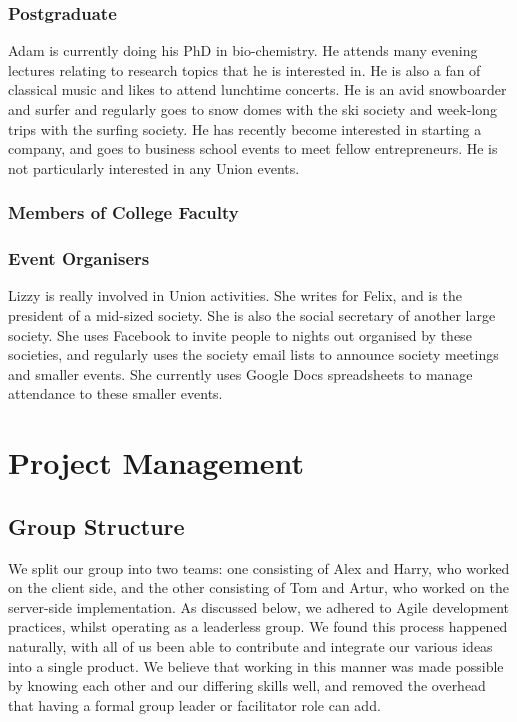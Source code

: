 \documentclass[11pt]{article}
\begin{document}
\subsubsection{Postgraduate}
Adam is currently doing his PhD in bio-chemistry. He attends many evening lectures relating to research topics that he is interested in. He is also a fan of classical music and likes to attend lunchtime concerts. He is an avid snowboarder and surfer and regularly goes to snow domes with the ski society and week-long trips with the surfing society. He has recently become interested in starting a company, and goes to business school events to meet fellow entrepreneurs. He is not particularly interested in any Union events.

\subsubsection{Members of College Faculty}
\subsubsection{Event Organisers}
Lizzy is really involved in Union activities. She writes for Felix, and is the president of a mid-sized society. She is also the social secretary of another large society. She uses Facebook to invite people to nights out organised by these societies, and regularly uses the society email lists to announce society meetings and smaller events. She currently uses Google Docs spreadsheets to manage attendance to these smaller events.
\section {Project Management}

\subsection {Group Structure}

We split our group into two teams: one consisting of Alex and Harry, who worked on the client side, and the other consisting of Tom and Artur, who worked on the server-side implementation. As discussed below, we adhered to Agile development practices, whilst operating as a leaderless group. We found this process happened naturally, with all of us been able to contribute and integrate our various ideas into a single product. We believe that working in this manner was made possible by knowing each other and our differing skills well, and removed the overhead that having a formal group leader or facilitator role can add.
\end{document}
